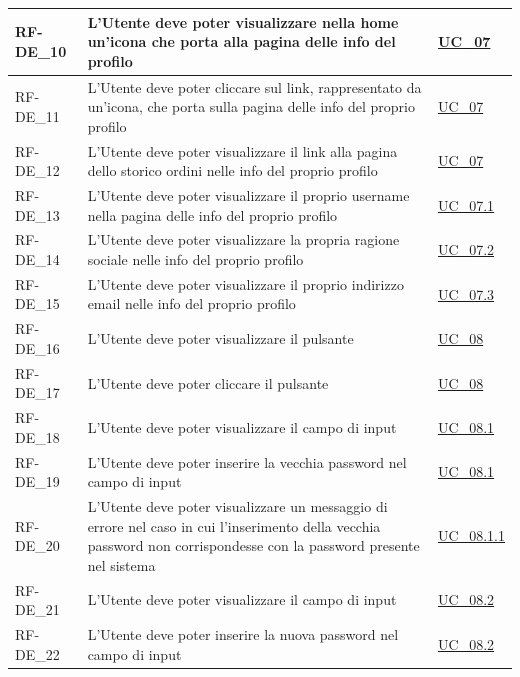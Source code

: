 \begin{longtable}{|>{\raggedright}p{}|>{\raggedright\arraybackslash}p{}|>{\raggedright\arraybackslash}p{}|}
	\hline
	RF-DE\_10 \hypertarget{rf-de_10} & L'Utente deve poter visualizzare nella home un'icona che porta alla pagina delle info del profilo & \hyperref[uc_07]{UC\_07} \\
	\hline
	RF-DE\_11 \hypertarget{rf-de_11} & L'Utente deve poter cliccare sul link, rappresentato da un'icona, che porta sulla pagina delle info del proprio profilo & \hyperref[uc_07]{UC\_07} \\
	\hline
	RF-DE\_12 \hypertarget{rf-de_12} & L'Utente deve poter visualizzare il link alla pagina dello storico ordini nelle info del proprio profilo & \hyperref[uc_07]{UC\_07} \\
	\hline
	RF-DE\_13 \hypertarget{rf-de_13} & L'Utente deve poter visualizzare il proprio username nella pagina delle info del proprio profilo & \hyperref[uc_07.1]{UC\_07.1} \\
	\hline
	RF-DE\_14 \hypertarget{rf-de_14} & L'Utente deve poter visualizzare la propria ragione sociale nelle info del proprio profilo & \hyperref[uc_07.2]{UC\_07.2} \\
	\hline
	RF-DE\_15 \hypertarget{rf-de_15} & L'Utente deve poter visualizzare il proprio indirizzo email nelle info del proprio profilo & \hyperref[uc_07.3]{UC\_07.3} \\
	\hline
	RF-DE\_16 \hypertarget{rf-de_16} & L'Utente deve poter visualizzare il pulsante \vr{Reimposta password} & \hyperref[uc_08]{UC\_08} \\
	\hline
	RF-DE\_17 \hypertarget{rf-de_17} & L'Utente deve poter cliccare il pulsante \vr{Reimposta password} & \hyperref[uc_08]{UC\_08} \\
	\hline
	RF-DE\_18 \hypertarget{rf-de_18} & L'Utente deve poter visualizzare il campo di input \vr{Vecchia password} & \hyperref[uc_08.1]{UC\_08.1} \\
	\hline
	RF-DE\_19 \hypertarget{rf-de_19} & L'Utente deve poter inserire la vecchia password nel campo di input \vr{Vecchia password} & \hyperref[uc_08.1]{UC\_08.1} \\
	\hline
	RF-DE\_20 \hypertarget{rf-de_20} & L'Utente deve poter visualizzare un messaggio di errore nel caso in cui l'inserimento della vecchia password non corrispondesse con la password presente nel sistema & \hyperref[uc_08.1.1]{UC\_08.1.1} \\
	\hline
	RF-DE\_21 \hypertarget{rf-de_21} & L'Utente deve poter visualizzare il campo di input \vr{Nuova password} & \hyperref[uc_08.2]{UC\_08.2} \\
	\hline
	RF-DE\_22 \hypertarget{rf-de_22} & L'Utente deve poter inserire la nuova password nel campo di input \vr{Nuova password} & \hyperref[uc_08.2]{UC\_08.2} \\

\end{longtable}
